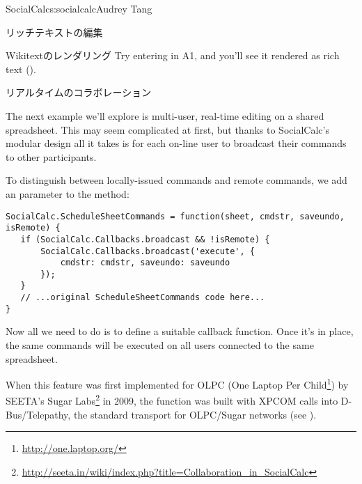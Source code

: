 \begin{aosachapter}{SocialCalc}{s:socialcalc}{Audrey Tang}
\begin{aosasect1}{リッチテキストの編集}
\begin{aosasect2}{Wikitextのレンダリング}
\noindent Try entering  in A1, and you'll
see it rendered as rich text ().


\end{aosasect2}

\end{aosasect1}


\begin{aosasect1}{リアルタイムのコラボレーション}

The next example we'll explore is multi-user, real-time editing on a
shared spreadsheet.  This may seem complicated at first, but thanks to
SocialCalc's modular design all it takes is for each on-line user to
broadcast their commands to other participants.

To distinguish between locally-issued commands and remote commands, we
add an  parameter to the 
method:

\begin{verbatim}
SocialCalc.ScheduleSheetCommands = function(sheet, cmdstr, saveundo, isRemote) {
   if (SocialCalc.Callbacks.broadcast && !isRemote) {
       SocialCalc.Callbacks.broadcast('execute', {
           cmdstr: cmdstr, saveundo: saveundo
       });
   }
   // ...original ScheduleSheetCommands code here...
}
\end{verbatim}

\noindent Now all we need to do is to define a suitable
 callback function.  Once it's
in place, the same commands will be executed on all users connected
to the same spreadsheet.

When this feature was first implemented for OLPC (One Laptop Per 
Child\footnote{\url{http://one.laptop.org/}}) by SEETA's Sugar 
Labs\footnote{\url{http://seeta.in/wiki/index.php?title=Collaboration_in_SocialCalc}}
in 2009, the  function was built with XPCOM calls into
D-Bus/Telepathy, the standard transport for OLPC/Sugar networks (see
).



\end{aosasect1}
\end{aosachapter}
